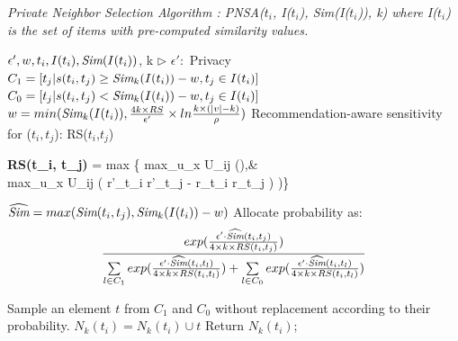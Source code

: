 \begin{algorithm}[!htb]
\caption{\small\itshape Private Neighbor Selection Algorithm : PNSA($t_i$, I($t_i$), \emph{Sim}(I($t_i$)), k) where I($t_i$) is the set of items with pre-computed similarity values.}
\label{Algo:pnsa}
\begin{algorithmic}[1]
\Require $\epsilon', w, t_i, I(t_i), \emph{Sim}(I(t_i))$, k		\hfill $\rhd$ $\epsilon':$ Privacy 
    \State $C_1 = \lbrack t_j | s(t_i, t_j) \geq \emph{Sim}_k(I(t_i))-w, t_j \in I(t_i)\rbrack$
    \State $C_0 = \lbrack t_j | s(t_i, t_j) < \emph{Sim}_k(I(t_i))-w, t_j \in I(t_i)\rbrack$
    \State $w=min(\emph{Sim}_k(I(t_i)), \frac{4k \times RS}{\epsilon'} \times ln\frac{k \times (|v| - k)}{\rho})$
\State Recommendation-aware sensitivity for ($t_i,t_j$): RS($t_i$,$t_j$)
\vspace{-3mm}
{\small
\begin{flalign*}
{\bf RS(t_i, t_j) }= max \{
max_{u_x \in U_{ij}} (),&\\ 
 max_{u_x \in U_{ij}} ( {\parallel r'_{t_i} \parallel \times \parallel r'_{t_j} \parallel} -  {\parallel r_{t_i} \parallel \times \parallel r_{t_j} \parallel)}
)\}
\end{flalign*}}
\vspace{-4mm}
    \State $\widehat{\emph{Sim}} = max(\emph{Sim}(t_i, t_j), \emph{Sim}_k(I(t_i)) - w)$
    \State Allocate probability as:
    \vspace{-3mm}
    $$
    \frac{exp(\frac{\epsilon' \cdot \widehat{\emph{Sim}}(t_i, t_j)}{4 \times  k \times RS(t_i, t_j)})}{\sum \limits_{l \in C_1} exp(\frac{\epsilon' \cdot \widehat{\emph{Sim}}(t_i, t_l)}{4 \times k \times RS(t_i, t_l)}) +  \sum \limits_{l \in C_0} exp(\frac{\epsilon' \cdot \widehat{\emph{Sim}}(t_i, t_l)}{4 \times k \times RS(t_i, t_l)})}
	$$
    \vspace{-4mm}
	\EndFor 

	\State Sample an element $t$ from $C_1$ and $C_0$ without replacement according to their probability.
	\State $N_k(t_i)=N_k(t_i) \cup t$
	\EndFor
	\State Return $N_k(t_i)$; 
\end{algorithmic}
\end{algorithm}


